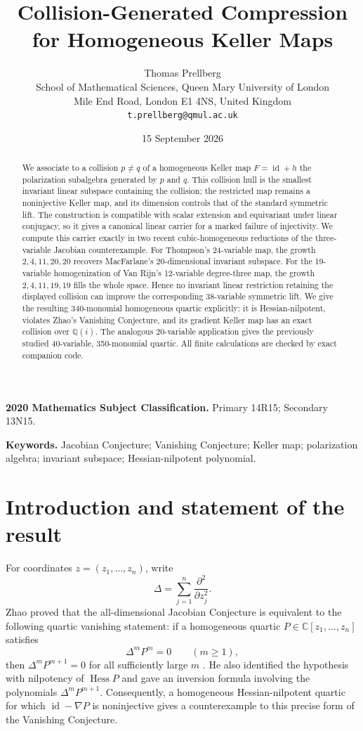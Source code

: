 \documentclass[11pt]{article}
\title{Collision-Generated Compression for Homogeneous Keller Maps}
\author{Thomas Prellberg\\
\small School of Mathematical Sciences, Queen Mary University of London\\
\small Mile End Road, London E1 4NS, United Kingdom\\
\small \texttt{t.prellberg@qmul.ac.uk}}
\date{15 September 2026}
\theoremstyle{remark}
\DeclareMathOperator{\Hess}{Hess}
\newcommand{\Q}{\mathbb{Q}}
\newcommand{\C}{\mathbb{C}}
\newcommand{\id}{\operatorname{id}}
\begin{document}
\maketitle

\begin{abstract}
We associate to a collision $p\ne q$ of a homogeneous Keller map $F=\id+h$ the polarization subalgebra generated by $p$ and $q$. This collision hull is the smallest invariant linear subspace containing the collision; the restricted map remains a noninjective Keller map, and its dimension controls that of the standard symmetric lift. The construction is compatible with scalar extension and equivariant under linear conjugacy, so it gives a canonical linear carrier for a marked failure of injectivity. We compute this carrier exactly in two recent cubic-homogeneous reductions of the three-variable Jacobian counterexample. For Thompson's 24-variable map, the growth $2,4,11,20,20$ recovers MacFarlane's 20-dimensional invariant subspace. For the 19-variable homogenization of Van Rijn's 12-variable degree-three map, the growth $2,4,11,19,19$ fills the whole space. Hence no invariant linear restriction retaining the displayed collision can improve the corresponding 38-variable symmetric lift. We give the resulting 340-monomial homogeneous quartic explicitly: it is Hessian-nilpotent, violates Zhao's Vanishing Conjecture, and its gradient Keller map has an exact collision over $\Q(i)$. The analogous 20-variable application gives the previously studied 40-variable, 350-monomial quartic. All finite calculations are checked by exact companion code.
\end{abstract}

\noindent\textbf{2020 Mathematics Subject Classification.} Primary 14R15; Secondary 13N15.

\medskip
\noindent\textbf{Keywords.} Jacobian Conjecture; Vanishing Conjecture; Keller map; polarization algebra; invariant subspace; Hessian-nilpotent polynomial.

\section{Introduction and statement of the result}

For coordinates $z=(z_1,\ldots,z_n)$, write
\[
\Delta=\sum_{j=1}^n \frac{\partial^2}{\partial z_j^2}.
\]
Zhao proved that the all-dimensional Jacobian Conjecture is equivalent to the following quartic vanishing statement: if a homogeneous quartic $P\in\C[z_1,\ldots,z_n]$ satisfies
\[
\Delta^m P^m=0\qquad(m\ge 1),
\]
then $\Delta^mP^{m+1}=0$ for all sufficiently large $m$ \citep{Zhao2007}. He also identified the hypothesis with nilpotency of $\Hess P$ and gave an inversion formula involving the polynomials $\Delta^mP^{m+1}$. Consequently, a homogeneous Hessian-nilpotent quartic for which $\id-\nabla P$ is noninjective gives a counterexample to this precise form of the Vanishing Conjecture.
\end{document}
